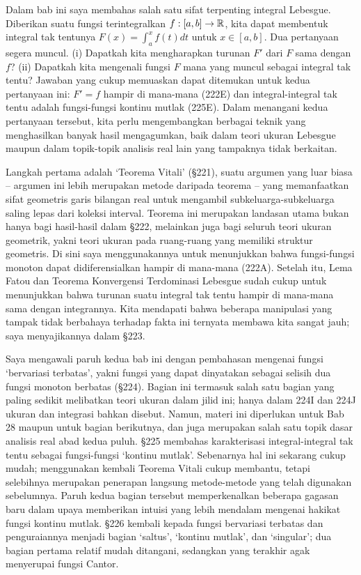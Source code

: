 
\def\chaptername{Teorema Dasar Kalkulus}
\def\sectionname{Pendahuluan}


Dalam bab ini saya membahas salah satu sifat terpenting integral
Lebesgue. Diberikan suatu fungsi terintegralkan $f:[a,b]\to\Bbb R$, kita
dapat membentuk integral tak tentunya $F(x)=\int_a^xf(t)dt$ untuk
$x\in[a,b]$. Dua pertanyaan segera muncul. (i) Dapatkah kita mengharapkan
turunan $F'$ dari $F$ sama dengan $f$? (ii) Dapatkah kita mengenali
fungsi $F$ mana yang muncul sebagai integral tak tentu? Jawaban
yang cukup memuaskan dapat ditemukan untuk kedua pertanyaan ini: $F'=f$
hampir di mana-mana (222E) dan integral-integral tak tentu adalah
fungsi-fungsi kontinu mutlak (225E). Dalam menangani kedua pertanyaan
tersebut, kita perlu mengembangkan berbagai teknik yang menghasilkan
banyak hasil mengagumkan, baik dalam teori ukuran Lebesgue maupun dalam
topik-topik analisis real lain yang tampaknya tidak berkaitan.

Langkah pertama adalah `Teorema Vitali' (\S221), suatu argumen yang
luar biasa -- argumen ini lebih merupakan metode daripada teorema --
yang memanfaatkan sifat geometris garis bilangan real untuk mengambil
subkeluarga-subkeluarga saling lepas dari koleksi interval. Teorema ini
merupakan landasan utama bukan hanya bagi hasil-hasil dalam \S222,
melainkan juga bagi seluruh teori ukuran geometrik, yakni teori ukuran
pada ruang-ruang yang memiliki struktur geometris. Di sini saya
menggunakannya untuk menunjukkan bahwa fungsi-fungsi monoton dapat
didiferensialkan hampir di mana-mana (222A). Setelah itu, Lema Fatou dan
Teorema Konvergensi Terdominasi Lebesgue sudah cukup untuk menunjukkan
bahwa turunan suatu integral tak tentu hampir di mana-mana sama dengan
integrannya. Kita mendapati bahwa beberapa manipulasi yang tampak tidak
berbahaya terhadap fakta ini ternyata membawa kita sangat jauh; saya
menyajikannya dalam \S223.

Saya mengawali paruh kedua bab ini dengan pembahasan mengenai fungsi
`bervariasi terbatas', yakni fungsi yang dapat dinyatakan sebagai
selisih dua fungsi monoton berbatas (\S224). Bagian ini termasuk salah
satu bagian yang paling sedikit melibatkan teori ukuran dalam jilid ini;
hanya dalam 224I dan 224J ukuran dan integrasi bahkan disebut. Namun,
materi ini diperlukan untuk Bab 28 maupun untuk bagian berikutnya, dan
juga merupakan salah satu topik dasar analisis real abad kedua puluh.
\S225 membahas karakterisasi integral-integral tak tentu sebagai
fungsi-fungsi `kontinu mutlak'. Sebenarnya hal ini sekarang cukup mudah;
menggunakan kembali Teorema Vitali cukup membantu, tetapi selebihnya merupakan
penerapan langsung metode-metode yang telah digunakan sebelumnya. Paruh
kedua bagian tersebut memperkenalkan beberapa gagasan baru dalam upaya
memberikan intuisi yang lebih mendalam mengenai hakikat fungsi
kontinu mutlak. \S226 kembali kepada fungsi bervariasi terbatas dan
penguraiannya menjadi bagian `saltus', `kontinu mutlak', dan `singular';
dua bagian pertama relatif mudah ditangani, sedangkan yang terakhir agak
menyerupai fungsi Cantor.



\discrpage
